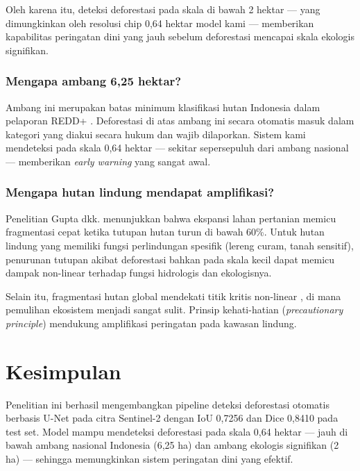 \documentclass[12pt,a4paper]{article}
\begin{document}
Oleh karena itu, deteksi deforestasi pada skala di bawah 2 hektar — yang
dimungkinkan oleh resolusi chip 0,64 hektar model kami — memberikan kapabilitas
peringatan dini yang jauh sebelum deforestasi mencapai skala ekologis signifikan.

\subsubsection{Mengapa ambang 6,25 hektar?}

Ambang ini merupakan batas minimum klasifikasi hutan Indonesia dalam pelaporan
REDD+ \cite{unfccc2022indonesia, wri2024forest}. Deforestasi di atas ambang ini
secara otomatis masuk dalam kategori yang diakui secara hukum dan wajib
dilaporkan. Sistem kami mendeteksi pada skala 0,64 hektar — sekitar sepersepuluh
dari ambang nasional — memberikan \textit{early warning} yang sangat awal.

\subsubsection{Mengapa hutan lindung mendapat amplifikasi?}

Penelitian Gupta dkk. \cite{gupta2025fragmentation} menunjukkan bahwa ekspansi
lahan pertanian memicu fragmentasi cepat ketika tutupan hutan turun di bawah
60\%. Untuk hutan lindung yang memiliki fungsi perlindungan spesifik (lereng
curam, tanah sensitif), penurunan tutupan akibat deforestasi bahkan pada
skala kecil dapat memicu dampak non-linear terhadap fungsi hidrologis dan
ekologisnya.

Selain itu, fragmentasi hutan global mendekati titik kritis non-linear
\cite{taubert2018fragmentation}, di mana pemulihan ekosistem menjadi sangat
sulit. Prinsip kehati-hatian (\textit{precautionary principle}) mendukung
amplifikasi peringatan pada kawasan lindung.

\section{Kesimpulan}
\label{sec:kesimpulan}

Penelitian ini berhasil mengembangkan pipeline deteksi deforestasi otomatis
berbasis U-Net pada citra Sentinel-2 dengan IoU 0,7256 dan Dice 0,8410 pada
test set. Model mampu mendeteksi deforestasi pada skala 0,64 hektar — jauh
di bawah ambang nasional Indonesia (6,25 ha) dan ambang ekologis signifikan
(2 ha) — sehingga memungkinkan sistem peringatan dini yang efektif.
\end{document}
